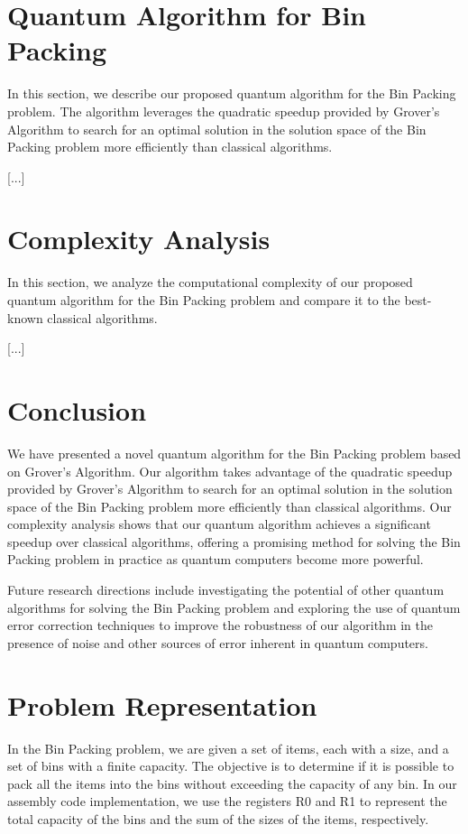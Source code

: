 \section{Quantum Algorithm for Bin Packing}\label{sec:algorithm}
In this section, we describe our proposed quantum algorithm for the Bin Packing problem. The algorithm leverages the quadratic speedup provided by Grover's Algorithm to search for an optimal solution in the solution space of the Bin Packing problem more efficiently than classical algorithms.

[...]

\section{Complexity Analysis}\label{sec:complexity}
In this section, we analyze the computational complexity of our proposed quantum algorithm for the Bin Packing problem and compare it to the best-known classical algorithms.

[...]

\section{Conclusion}\label{sec:conclusion}
We have presented a novel quantum algorithm for the Bin Packing problem based on Grover's Algorithm. Our algorithm takes advantage of the quadratic speedup provided by Grover's Algorithm to search for an optimal solution in the solution space of the Bin Packing problem more efficiently than classical algorithms. Our complexity analysis shows that our quantum algorithm achieves a significant speedup over classical algorithms, offering a promising method for solving the Bin Packing problem in practice as quantum computers become more powerful.

Future research directions include investigating the potential of other quantum algorithms for solving the Bin Packing problem and exploring the use of quantum error correction techniques to improve the robustness of our algorithm in the presence of noise and other sources of error inherent in quantum computers.






\section{Problem Representation}
In the Bin Packing problem, we are given a set of items, each with a size, and a set of bins with a finite capacity. The objective is to determine if it is possible to pack all the items into the bins without exceeding the capacity of any bin. In our assembly code implementation, we use the registers R0 and R1 to represent the total capacity of the bins and the sum of the sizes of the items, respectively.

